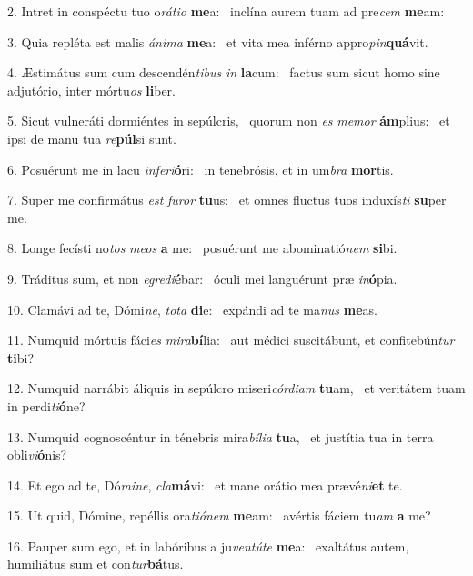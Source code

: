 2. Intret in conspéctu tuo o\textit{rá}\textit{ti}\textit{o} \textbf{me}a: \ast\  inclína aurem tuam ad pre\textit{cem} \textbf{me}am:\

3. Quia repléta est malis \textit{á}\textit{ni}\textit{ma} \textbf{me}a: \ast\  et vita mea inférno appro\textit{pin}\textbf{quá}vit.\

4. Æstimátus sum cum descendén\textit{ti}\textit{bus} \textit{in} \textbf{la}cum: \ast\  factus sum sicut homo sine adjutório, inter mórtu\textit{os} \textbf{li}ber.\

5. Sicut vulneráti dormiéntes in sepúlcris, \dag\  quorum non \textit{es} \textit{me}\textit{mor} \textbf{ám}plius: \ast\  et ipsi de manu tua \textit{re}\textbf{púl}si sunt.\

6. Posuérunt me in lacu \textit{in}\textit{fe}\textit{ri}\textbf{ó}ri: \ast\  in tenebrósis, et in um\textit{bra} \textbf{mor}tis.\

7. Super me confirmátus \textit{est} \textit{fu}\textit{ror} \textbf{tu}us: \ast\  et omnes fluctus tuos induxís\textit{ti} \textbf{su}per me.\

8. Longe fecísti no\textit{tos} \textit{me}\textit{os} \textbf{a} me: \ast\  posuérunt me abominatió\textit{nem} \textbf{si}bi.\

9. Tráditus sum, et non \textit{e}\textit{gre}\textit{di}\textbf{é}bar: \ast\  óculi mei languérunt præ \textit{in}\textbf{ó}pia.\

10. Clamávi ad te, Dómi\textit{ne}, \textit{to}\textit{ta} \textbf{di}e: \ast\  expándi ad te ma\textit{nus} \textbf{me}as.\

11. Numquid mórtuis fáci\textit{es} \textit{mi}\textit{ra}\textbf{bí}lia: \ast\  aut médici suscitábunt, et confitebún\textit{tur} \textbf{ti}bi?\

12. Numquid narrábit áliquis in sepúlcro miseri\textit{cór}\textit{di}\textit{am} \textbf{tu}am, \ast\  et veritátem tuam in perdi\textit{ti}\textbf{ó}ne?\

13. Numquid cognoscéntur in ténebris mira\textit{bí}\textit{li}\textit{a} \textbf{tu}a, \ast\  et justítia tua in terra obli\textit{vi}\textbf{ó}nis?\

14. Et ego ad te, Dó\textit{mi}\textit{ne}, \textit{cla}\textbf{má}vi: \ast\  et mane orátio mea prævé\textit{ni}\textbf{et} te.\

15. Ut quid, Dómine, repéllis ora\textit{ti}\textit{ó}\textit{nem} \textbf{me}am: \ast\  avértis fáciem tu\textit{am} \textbf{a} me?\

16. Pauper sum ego, et in labóribus a ju\textit{ven}\textit{tú}\textit{te} \textbf{me}a: \ast\  exaltátus autem, humiliátus sum et con\textit{tur}\textbf{bá}tus.\

